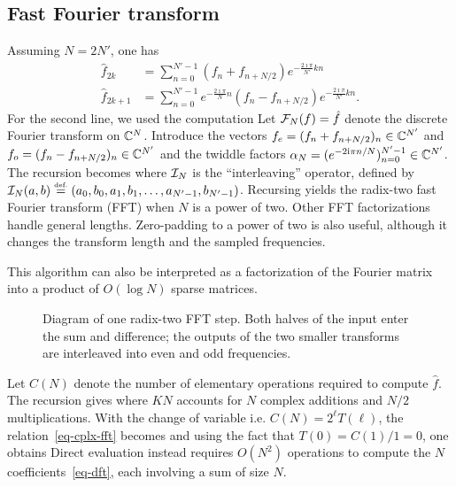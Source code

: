 \subsection{Fast Fourier transform}

Assuming $N=2N'$, one has 
\begin{align*}
	\hat f_{2k} &= \sum_{n=0}^{N'-1} (f_n + f_{n+N/2}) e^{ -\frac{2\imath\pi}{N'} k n } \\
	\hat f_{2k+1} &= \sum_{n=0}^{N'-1} e^{ -\frac{2\imath\pi}{N} n } (f_n - f_{n+N/2}) e^{ -\frac{2\imath\pi}{N'} k n }.
\end{align*}
For the second line, we used the computation
Let $\mathcal{F}_N(f)=\hat f$ denote the discrete Fourier transform on $\mathbb{C}^N$. Introduce
the vectors $f_e = (f_n + f_{n+N/2})_n \in \mathbb{C}^{N'}$ and $f_o = (f_n - f_{n+N/2})_n \in \mathbb{C}^{N'}$
and the twiddle factors $\alpha_N=(e^{-2\mathrm{i}\pi n/N})_{n=0}^{N'-1}\in\mathbb{C}^{N'}$. The recursion becomes
where $\mathcal{I}_N$ is the ``interleaving'' operator, defined by $\mathcal{I}_N(a,b) \stackrel{\mbox{\upshape\tiny def.}}{=} (a_0,b_0,a_1,b_1,\ldots,a_{N'-1},b_{N'-1})$.
%
Recursing yields the radix-two fast Fourier transform (FFT) when $N$ is a power of two. Other FFT factorizations handle general lengths. Zero-padding to a power of two is also useful, although it changes the transform length and the sampled frequencies.

This algorithm can also be interpreted as a factorization of the Fourier matrix into a product of $O(\log N)$ sparse matrices.

\begin{figure}[tbp]
\centering
{}
\caption{Diagram of one radix-two FFT step. Both halves of the input enter the sum and difference; the outputs of the two smaller transforms are interleaved into even and odd frequencies.}
\label{fig-fft}
\end{figure}
 

Let $C(N)$ denote the number of elementary operations required to compute $\hat f$. The recursion gives
where $K N$ accounts for $N$ complex additions and $N/2$ multiplications. With the change of variable
i.e. $C(N)=2^\ell T(\ell)$, the relation~\eqref{eq-cplx-fft} becomes
and using the fact that $T(0)=C(1)/1=0$, one obtains
Direct evaluation instead requires $O(N^2)$ operations to compute the $N$ coefficients~\eqref{eq-dft}, each involving a sum of size $N$.


